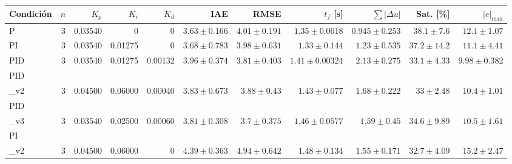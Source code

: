 \begin{tabular}{lrrrrrrrrrr}
\hline
Condici\'on & $n$ & $K_p$ & $K_i$ & $K_d$ & IAE & RMSE & $t_f$ [s] & $\sum|\Delta u|$ & Sat. [\%] & $|e|_{\max}$ \\
\hline
P & 3 & 0.03540 & 0 & 0 & $3.63 \pm 0.166$ & $4.01 \pm 0.191$ & $1.35 \pm 0.0618$ & $0.945 \pm 0.253$ & $38.1 \pm 7.6$ & $12.1 \pm 1.07$ \\
PI & 3 & 0.03540 & 0.01275 & 0 & $3.68 \pm 0.783$ & $3.98 \pm 0.631$ & $1.33 \pm 0.144$ & $1.23 \pm 0.535$ & $37.2 \pm 14.2$ & $11.1 \pm 4.41$ \\
PID & 3 & 0.03540 & 0.01275 & 0.00132 & $3.96 \pm 0.374$ & $3.81 \pm 0.403$ & $1.41 \pm 0.00324$ & $2.13 \pm 0.275$ & $33.1 \pm 4.33$ & $9.98 \pm 0.382$ \\
PID\\_v2 & 3 & 0.04500 & 0.06000 & 0.00040 & $3.83 \pm 0.673$ & $3.88 \pm 0.43$ & $1.43 \pm 0.077$ & $1.68 \pm 0.222$ & $33 \pm 2.48$ & $10.4 \pm 1.01$ \\
PID\\_v3 & 3 & 0.03540 & 0.02500 & 0.00060 & $3.81 \pm 0.308$ & $3.7 \pm 0.375$ & $1.46 \pm 0.0577$ & $1.59 \pm 0.45$ & $34.6 \pm 9.89$ & $10.5 \pm 1.61$ \\
PI\\_v2 & 3 & 0.04500 & 0.06000 & 0 & $4.39 \pm 0.363$ & $4.94 \pm 0.642$ & $1.48 \pm 0.134$ & $1.55 \pm 0.171$ & $32.7 \pm 4.09$ & $15.2 \pm 2.47$ \\
\hline
\end{tabular}
